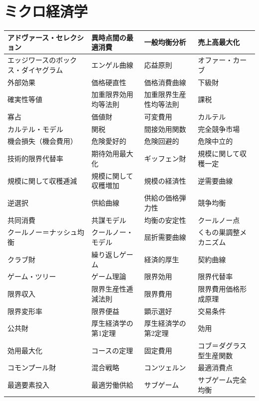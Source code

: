 \documentclass[xelatex,a4paper,base=11pt,ja=standard,jafont=noto]{bxjsreport}
\begin{document}
\section{ミクロ経済学}
\begin{table}[H]
\centering
\small
\begin{tabular}{|>{\raggedright\arraybackslash}p{3.5cm}|>{\raggedright\arraybackslash}p{3.5cm}|>{\raggedright\arraybackslash}p{3.5cm}|>{\raggedright\arraybackslash}p{3.5cm}|}
\hline
アドヴァース・セレクション & 異時点間の最適消費 & 一般均衡分析 & 売上高最大化 \\
\hline
エッジワースのボックス・ダイヤグラム & エンゲル曲線 & 応益原則 & オファー・カーブ \\
\hline
外部効果 & 価格硬直性 & 価格消費曲線 & 下級財 \\
\hline
確実性等値 & 加重限界効用均等法則 & 加重限界生産性均等法則 & 課税 \\
\hline
寡占 & 価値財 & 可変費用 & カルテル \\
\hline
カルテル・モデル & 関税 & 間接効用関数 & 完全競争市場 \\
\hline
機会損失（機会費用） & 危険愛好的 & 危険回避的 & 危険中立的 \\
\hline
技術的限界代替率 & 期待効用最大化 & ギッフェン財 & 規模に関して収穫一定 \\
\hline
規模に関して収穫逓減 & 規模に関して収穫増加 & 規模の経済性 & 逆需要曲線 \\
\hline
逆選択 & 供給曲線 & 供給の価格弾力性 & 競争均衡 \\
\hline
共同消費 & 共謀モデル & 均衡の安定性 & クールノー点 \\
\hline
クールノー＝ナッシュ均衡 & クールノー・モデル & 屈折需要曲線 & くもの巣調整メカニズム \\
\hline
クラブ財 & 繰り返しゲーム & 経済的厚生 & 契約曲線 \\
\hline
ゲーム・ツリー & ゲーム理論 & 限界効用 & 限界代替率 \\
\hline
限界収入 & 限界生産性逓減法則 & 限界費用 & 限界費用価格形成原理 \\
\hline
限界変形率 & 限界便益 & 顕示選好 & 交易条件 \\
\hline
公共財 & 厚生経済学の第1定理 & 厚生経済学の第2定理 & 効用 \\
\hline
効用最大化 & コースの定理 & 固定費用 & コブ＝ダグラス型生産関数 \\
\hline
コモンプール財 & 混合戦略 & コンツェルン & 最適消費点 \\
\hline
最適要素投入 & 最適労働供給 & サブゲーム & サブゲーム完全均衡 \\

\end{tabular}
\end{table}
\end{document}
